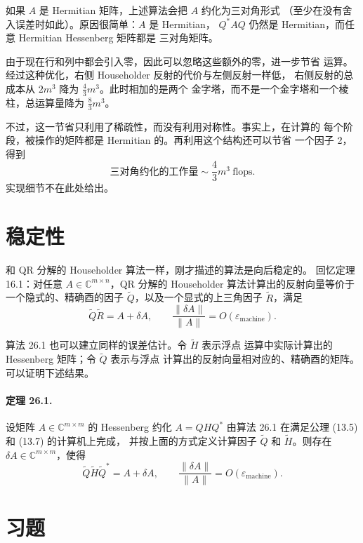 \documentclass[UTF8,fontset=none,12pt]{ctexart}
\newcommand{\epsmach}{\varepsilon_{\mathrm{machine}}}
\begin{document}
如果 $A$ 是 Hermitian 矩阵，上述算法会把 $A$ 约化为三对角形式
（至少在没有舍入误差时如此）。原因很简单：$A$ 是 Hermitian，
$Q^*AQ$ 仍然是 Hermitian，而任意 Hermitian Hessenberg 矩阵都是
三对角矩阵。

由于现在行和列中都会引入零，因此可以忽略这些额外的零，进一步节省
运算。经过这种优化，右侧 Householder 反射的代价与左侧反射一样低，
右侧反射的总成本从 $2m^3$ 降为 $\frac43m^3$。此时相加的是两个
金字塔，而不是一个金字塔和一个棱柱，总运算量降为 $\frac83m^3$。

不过，这一节省只利用了稀疏性，而没有利用对称性。事实上，在计算的
每个阶段，被操作的矩阵都是 Hermitian 的。再利用这个结构还可以节省
一个因子 2，得到
\begin{equation}
 \text{三对角约化的工作量}\sim\frac43m^3\ \text{flops}.
\tag{26.2}
\end{equation}
实现细节不在此处给出。

\section*{稳定性}

和 QR 分解的 Householder 算法一样，刚才描述的算法是向后稳定的。
回忆定理 16.1：对任意 $A\in\mathbb{C}^{m\times n}$，QR 分解的
Householder 算法计算出的反射向量等价于一个隐式的、精确酉的因子
$\widetilde Q$，以及一个显式的上三角因子 $\widetilde R$，满足
\[
 \widetilde Q\widetilde R=A+\delta A,\qquad
 \frac{\|\delta A\|}{\|A\|}=O(\epsmach).
\]

算法 26.1 也可以建立同样的误差估计。令 $\widetilde H$ 表示浮点
运算中实际计算出的 Hessenberg 矩阵；令 $\widetilde Q$ 表示与浮点
计算出的反射向量相对应的、精确酉的矩阵。可以证明下述结果。

\paragraph{定理 26.1.}
设矩阵 $A\in\mathbb{C}^{m\times m}$ 的 Hessenberg 约化
$A=QHQ^*$ 由算法 26.1 在满足公理 (13.5) 和 (13.7) 的计算机上完成，
并按上面的方式定义计算因子 $\widetilde Q$ 和 $\widetilde H$。则存在
$\delta A\in\mathbb{C}^{m\times m}$，使得
\begin{equation}
 \widetilde Q\widetilde H\widetilde Q^*
 =A+\delta A,\qquad
 \frac{\|\delta A\|}{\|A\|}=O(\epsmach).
\tag{26.3}
\end{equation}

\section*{习题}
\end{document}
